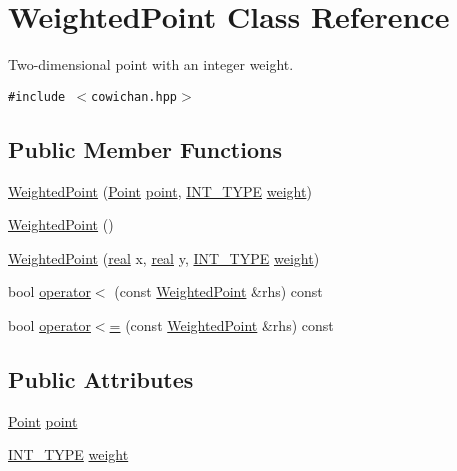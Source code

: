 \hypertarget{class_weighted_point}{
\section{WeightedPoint Class Reference}
\label{class_weighted_point}
}
Two-dimensional point with an integer weight.  


{\tt \#include $<$cowichan.hpp$>$}

\subsection*{Public Member Functions}
\begin{CompactItemize}
\item 
\hyperlink{class_weighted_point_1fc45412653300484ff917c0df7716c7}{WeightedPoint} (\hyperlink{class_point}{Point} \hyperlink{class_weighted_point_ab8d1b3ff0e79d5b479e5f61eee1be23}{point}, \hyperlink{cowichan_8hpp_c96945095fd0ce7186a1d00a89f77d2c}{INT\_\-TYPE} \hyperlink{class_weighted_point_e41e421882ec4d21e70379120c2eab61}{weight})
\item 
\hyperlink{class_weighted_point_2a40faca74cd70475c325148056be842}{WeightedPoint} ()
\item 
\hyperlink{class_weighted_point_7e3ace28b58144f273b7d178b6fb0a06}{WeightedPoint} (\hyperlink{cowichan_8hpp_4d521b2c54a1f6312cc8fa04827eaf98}{real} x, \hyperlink{cowichan_8hpp_4d521b2c54a1f6312cc8fa04827eaf98}{real} y, \hyperlink{cowichan_8hpp_c96945095fd0ce7186a1d00a89f77d2c}{INT\_\-TYPE} \hyperlink{class_weighted_point_e41e421882ec4d21e70379120c2eab61}{weight})
\item 
bool \hyperlink{class_weighted_point_714944b15d891557a47a69b4d425da58}{operator$<$} (const \hyperlink{class_weighted_point}{WeightedPoint} \&rhs) const 
\item 
bool \hyperlink{class_weighted_point_f88df27a98c5849233572da3b504564c}{operator$<$=} (const \hyperlink{class_weighted_point}{WeightedPoint} \&rhs) const 
\end{CompactItemize}
\subsection*{Public Attributes}
\begin{CompactItemize}
\item 
\hyperlink{class_point}{Point} \hyperlink{class_weighted_point_ab8d1b3ff0e79d5b479e5f61eee1be23}{point}
\item 
\hyperlink{cowichan_8hpp_c96945095fd0ce7186a1d00a89f77d2c}{INT\_\-TYPE} \hyperlink{class_weighted_point_e41e421882ec4d21e70379120c2eab61}{weight}
\end{CompactItemize}


